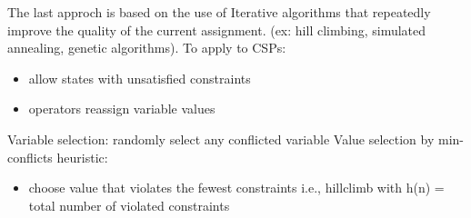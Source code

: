 \documentclass[12pt]{article}
\begin{document}
\begin{enumerate}
    The last approch is based on the use of Iterative algorithms that repeatedly improve the quality of the current assignment.
    (ex: hill climbing, simulated annealing, genetic algorithms).
    To apply to CSPs: 
    \begin{itemize}
        \item allow states with unsatisfied constraints
        \item operators reassign variable values
    \end{itemize}
    Variable selection: randomly select any conflicted variable 
    Value selection by min-conflicts heuristic: 
    \begin{itemize}
        \item choose value that violates the fewest constraints i.e., hillclimb with h(n) = total number of violated constraints
    \end{itemize}

\end{enumerate}
\end{document}

